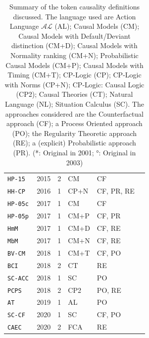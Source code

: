 \documentclass[11pt,a4paper]{book}
\theoremstyle{definition}
\theoremstyle{definition}
\theoremstyle{definition}
\theoremstyle{remark}
\newcommand{\hpm}{\texttt{HP-15}\,}
\newcommand{\hhcp}{\texttt{HH-CP}\,}
\newcommand{\hpuc}{\texttt{HP-05c}\,}
\newcommand{\hpup}{\texttt{HP-05p}\,}
\newcommand{\hmm}{\texttt{HmM}\,}
\newcommand{\mbm}{\texttt{MbM}\,}
\newcommand{\bvcm}{\texttt{BV-CM}\,}
\newcommand{\bci}{\texttt{BCI}\,}
\newcommand{\scacc}{\texttt{SC-ACC}\,}
\newcommand{\pcps}{\texttt{PCPS}\,}
\newcommand{\at}{\texttt{AT}\,}
\newcommand{\sccf}{\texttt{SC-CF}\,}
\newcommand{\caec}{\texttt{CAEC}\,}
\begin{document}
\begin{table}
\begin{tabular}{llllll}
\hpm &	2015 &	2 &	CM &	CF &	\parencite{halpern2015modification} \\
\hhcp &	2016 &	1 &	 CP+N &	 CF, PR, RE &	\parencite{beckers2016general} \\
\hpuc &	2017 &	1 &	 CM &	 CF &	\parencite{fenton2017proposed}  \\
\hpup &	2017 &	1 &	 CM+P &	 CF, PR &	\parencite{fenton2017proposed}  \\
\hmm &	2017 &	1 &	 CM+D &	 CF, RE &	\parencite{blanchard2017cause} \\
\mbm &	2017 &	1 &	 CM+N &	 CF, RE &	\parencite{blanchard2017cause} \\
\bvcm &	2018 &	1 &	 CM+T &	 CF, PO &	\parencite{beckers2018principled} \\
\bci &	2018 &	2 &	 CT &	 RE &	\parencite{bochman2018actual} \\
\scacc &	2018 &	1 &	 SC &	 PO &	\parencite{batusov2018situation} \\
\pcps &	2018 &	2 &	 CP2 &	 PO, RE &	\parencite{denecker2018causal} \\
\at &	2019 &	1 &	 AL &	 PO &	\parencite{leblanc2019explaining} \\
\sccf &	2020 &	1 &	 SC &	 CF, PO &	\parencite{khannecessary} \\
\caec &	2020 &	2 &	 FCA &	 RE &	\parencite{liepicna2020arguing} \\
\bottomrule
\end{tabular}
\caption{Summary of the token causality definitions discussed.
The language used are 
Action Language $\mathcal{AL}$ (AL);
Causal Models (CM); 
Causal Models with Default/Deviant distinction (CM+D);
Causal Models with Normality ranking (CM+N);
Probabilistic Causal Models (CM+P);
Causal Models with Timing (CM+T);
CP-Logic (CP);
CP-Logic with Norms (CP+N);
CP-Logic: Causal Logic (CP2);
Causal Theories (CT);
Natural Language (NL); 
Situation Calculus (SC).
The approaches considered are 
the Counterfactual approach (CF);
a Process Oriented approach (PO);
the Regularity Theoretic approach (RE);
a (explicit) Probabilistic approach (PR).
(*: Original in 2001; °: Original in 2003)
}
\label{tab:definition_summary}
\end{table}
\end{document}
